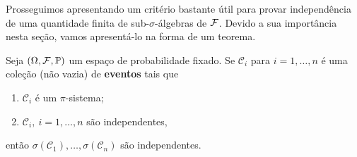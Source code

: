 Prosseguimos apresentando um critério bastante útil
para provar independência de uma 
quantidade finita de sub-$\sigma$-álgebras de $\mathcal{F}$.
Devido a sua importância nesta seção, vamos apresentá-lo
na forma de um teorema.

\begin{teorema}\label{teo-criterio-basico-independencia}
Seja $(\Omega,\mathcal{F},\mathbb{P})$ um espaço de probabilidade fixado.
Se $\mathcal{C}_i$ para $i=1,\ldots,n$ é uma 
coleção (não vazia) de {\bf eventos} tais que 
	\begin{enumerate}
		\item $\mathcal{C}_i	$ é um $\pi$-sistema;
		\item $\mathcal{C}_i,\ i=1,\ldots, n$ são independentes,
	\end{enumerate}	 	
então $\sigma(\mathcal{C}_1),\ldots, \sigma(\mathcal{C}_n)$ são 
independentes.
\end{teorema}




